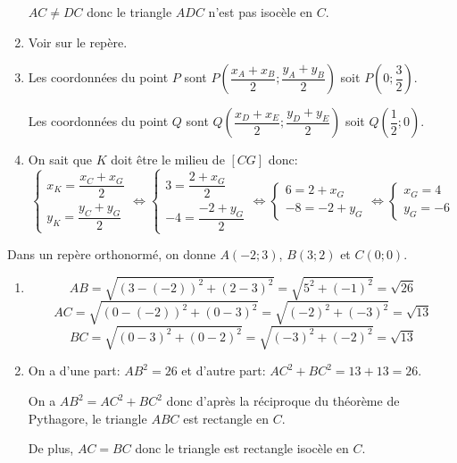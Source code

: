 \documentclass[a4paper]{article}
\begin{document}
\begin{exercice}{}{}
\begin{enumerate}
        $AC\neq DC$ donc le triangle $ADC$ n'est pas isocèle en $C$.
        
        \item Voir sur le repère.
        \item Les coordonnées du point $P$ sont $P\left(\dfrac{x_A+x_B}{2};\dfrac{y_A+y_B}{2}\right)$ soit $P(0;\dfrac{3}{2})$.
        
        Les coordonnées du point $Q$ sont $Q\left(\dfrac{x_D+x_E}{2};\dfrac{y_D+y_E}{2}\right)$ soit $Q(\dfrac{1}{2};0)$.
        
        \item On sait que $K$ doit être le milieu de $[CG]$ donc:
        $$
        \left\{
            \begin{array}{ll}
                x_K=\dfrac{x_C+x_G}{2} \\
                y_K=\dfrac{y_C+y_G}{2}
            \end{array}
        \right.\iff
        \left\{
            \begin{array}{ll}
                3=\dfrac{2+x_G}{2} \\
                -4=\dfrac{-2+y_G}{2}
            \end{array}
        \right.\iff
        \left\{
            \begin{array}{ll}
                6=2+x_G \\
                -8=-2+y_G
            \end{array}
        \right.\iff
        \left\{
            \begin{array}{ll}
                x_G=4 \\
                y_G=-6
            \end{array}
        \right.
        $$
    \end{enumerate}
    
    \end{exercice}
    
    \medskip
    
    \begin{exercice}{}{}
        Dans un repère orthonormé, on donne $A(-2; 3)$, $B(3;2)$ et $C(0;0)$.
    
        \begin{enumerate}
            \item 
            $$AB=\sqrt{(3-(-2))^2+(2-3)^2}=\sqrt{5^2+(-1)^2}=\sqrt{26}$$
            $$AC=\sqrt{(0-(-2))^2+(0-3)^2}=\sqrt{(-2)^2+(-3)^2}=\sqrt{13}$$
            $$BC=\sqrt{(0-3)^2+(0-2)^2}=\sqrt{(-3)^2+(-2)^2}=\sqrt{13}$$
            \item 
            On a d'une part: $AB^2=26$ et d'autre part: $AC^2+BC^2=13+13=26$.

            On a $AB^2=AC^2+BC^2$ donc d'après la réciproque du théorème de Pythagore, le triangle $ABC$ est rectangle en $C$.
            
            De plus, $AC=BC$ donc le triangle est rectangle isocèle en $C$.
        \end{enumerate}
    \end{exercice}
    \medskip
    
\end{document}
